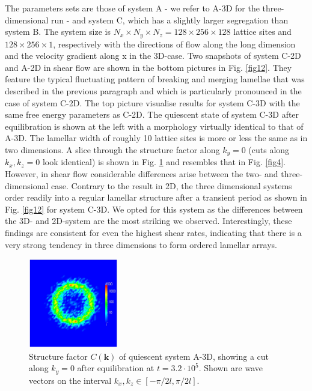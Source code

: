 \documentclass[8.5pt,twoside,twocolumn]{article}
\newcommand{\e}[1]{\cdot10^{#1}}
\begin{document}
The parameters sets are those of system A - we refer to A-3D for the three-dimensional run - and system C, which has a slightly larger segregation than system B.
The system size is $N_x\times N_y \times N_z=128\times256\times128$ lattice sites and $128\times256\times1$, respectively with the directions of flow along the long dimension and the velocity gradient along x in the 3D-case. 
Two snapshots of system C-2D and A-2D in shear flow are shown in the bottom pictures in Fig. \ref{fig12}.
They feature the typical fluctuating pattern of breaking and merging lamellae that was described in the previous paragraph and which is particularly pronounced in the case of system C-2D.
The top picture visualise results for system C-3D with the same free energy parameters as C-2D.
The quiescent state of system C-3D after equilibration is shown at the left with a morphology virtually identical to that of A-3D.
The lamellar width of roughly 10 lattice sites is more or less the same as in two dimensions.
A slice through the structure factor along $k_y=0$ (cuts along $k_x,k_z=0$ look identical) is shown in Fig. \ref{fig13} and resembles that in Fig. \ref{fig4}.
However, in shear flow considerable differences arise between the two- and three-dimensional case.
Contrary to the result in 2D, the three dimensional systems order readily into a regular lamellar structure after a transient period as shown in Fig. \ref{fig12} for system C-3D. 
We opted for this system as the differences between the 3D- and 2D-system are the most striking we observed.
Interestingly, these findings are consistent for even the highest shear rates, indicating that there is a very strong tendency in three dimensions to form ordered lamellar arrays.

\begin{figure}[htp!]
\centering
\includegraphics[angle=0,width=0.35\textwidth]{ck_y-slice_run786_320.jpg}
\caption{Structure factor $C({\mathbf k})$ of quiescent system A-3D, showing a cut along $k_y=0$ after equilibration at $t=3.2\e{5}$. Shown are wave vectors on the interval $k_x, k_z\in[-\pi/2 l,\pi/2 l]$.}
\label{fig13}
\end{figure}
\end{document}
